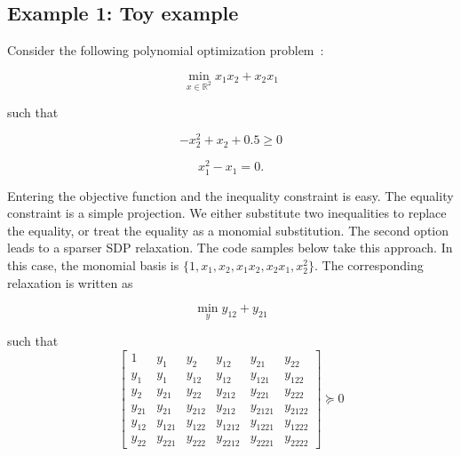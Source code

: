 \documentclass{article}
\begin{document}
\subsection{Example 1: Toy example}\label{example1}
Consider the following polynomial optimization problem~\citep{pironio2010convergent}:

\[ \min_{x\in \mathbb{R}^2}x_1x_2+x_2x_1\]

such that

\[ -x_2^2+x_2+0.5\geq 0\]

\[x_1^2-x_1=0.\]

Entering the objective function and the inequality constraint is easy. The equality constraint is a simple projection. We either substitute two inequalities to replace the equality, or treat the equality as a monomial substitution. The second option leads to a sparser SDP relaxation. The code samples below take this approach. In this case, the monomial basis is $\{1, x_1, x_2, x_1x_2, x_2x_1, x_2^2\}$. The corresponding relaxation is written as

\[ \min_{y}y_{12}+y_{21}\]

such that
\[
\left[\begin{array}{c|cc|ccc}
1 & y_{1} & y_{2} & y_{12} & y_{21} & y_{22}\\
\hline{}
y_{1} & y_{1} & y_{12} & y_{12} & y_{121} & y_{122}\\
y_{2} & y_{21} & y_{22} & y_{212} & y_{221} & y_{222}\\
\hline{}
y_{21} & y_{21} & y_{212} & y_{212} & y_{2121} & y_{2122} \\
y_{12} & y_{121} & y_{122} & y_{1212} & y_{1221} & y_{1222}\\
y_{22} & y_{221} & y_{222} & y_{2212} & y_{2221} & y_{2222}
\end{array} \right] \succeq{}0
\]
\end{document}
